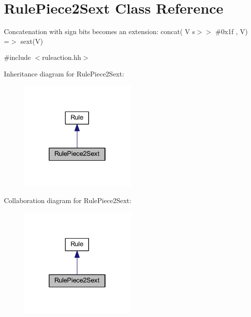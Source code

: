 \hypertarget{class_rule_piece2_sext}{}\section{Rule\+Piece2\+Sext Class Reference}
\label{class_rule_piece2_sext}


Concatenation with sign bits becomes an extension\+: {\ttfamily concat( V s$>$$>$ \#0x1f , V) =$>$ sext(\+V)}  




{\ttfamily \#include $<$ruleaction.\+hh$>$}



Inheritance diagram for Rule\+Piece2\+Sext\+:
\nopagebreak
\begin{figure}[H]
\begin{center}
\leavevmode
\includegraphics[width=166pt]{class_rule_piece2_sext__inherit__graph}
\end{center}
\end{figure}


Collaboration diagram for Rule\+Piece2\+Sext\+:
\nopagebreak
\begin{figure}[H]
\begin{center}
\leavevmode
\includegraphics[width=166pt]{class_rule_piece2_sext__coll__graph}
\end{center}
\end{figure}
